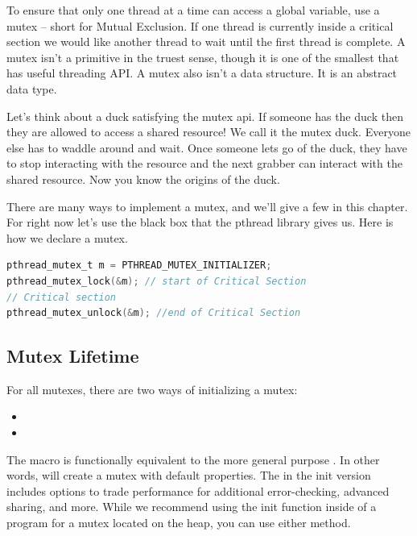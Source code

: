To ensure that only one thread at a time can access a global variable, use a mutex -- short for Mutual Exclusion.
If one thread is currently inside a critical section we would like another thread to wait until the first thread is complete.
A mutex isn't a primitive in the truest sense, though it is one of the smallest that has useful threading API.
A mutex also isn't a data structure.
It is an abstract data type.

Let's think about a duck satisfying the mutex api. If someone has the duck then they are allowed to access a shared resource! We call it the mutex duck. Everyone else has to waddle around and wait. Once someone lets go of the duck, they have to stop interacting with the resource and the next grabber can interact with the shared resource. Now you know the origins of the duck.

There are many ways to implement a mutex, and we'll give a few in this chapter.
For right now let's use the black box that the pthread library gives us.
Here is how we declare a mutex.

\begin{lstlisting}[language=C]
pthread_mutex_t m = PTHREAD_MUTEX_INITIALIZER;
pthread_mutex_lock(&m); // start of Critical Section
// Critical section
pthread_mutex_unlock(&m); //end of Critical Section
\end{lstlisting}

\subsection{Mutex Lifetime}

For all mutexes, there are two ways of initializing a mutex:
\begin{itemize}
\item{}
\item{}
\end{itemize}
The macro  is functionally equivalent to the more general purpose .
In other words,  will create a mutex with default properties.
The  in the init version includes options to trade performance for additional error-checking, advanced sharing, and more.
While we recommend using the init function inside of a program for a mutex located on the heap, you can use either method.

